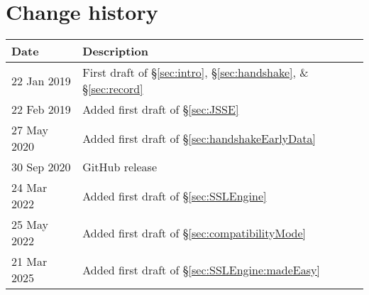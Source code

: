 \section*{Change history}


\begin{tabular}{l|l}
Date        & Description \\ \hline
22 Jan 2019 & First draft of \S\ref{sec:intro}, \S\ref{sec:handshake}, \& \S\ref{sec:record}    \\
22 Feb 2019 & Added first draft of \S\ref{sec:JSSE}                                             \\
27 May 2020 & Added first draft of \S\ref{sec:handshakeEarlyData}                               \\
30 Sep 2020 & GitHub release                                                                    \\
24 Mar 2022 & Added first draft of \S\ref{sec:SSLEngine}                                        \\
25 May 2022 & Added first draft of \S\ref{sec:compatibilityMode}                                \\
21 Mar 2025 & Added first draft of \S\ref{sec:SSLEngine:madeEasy}                               
\end{tabular}

